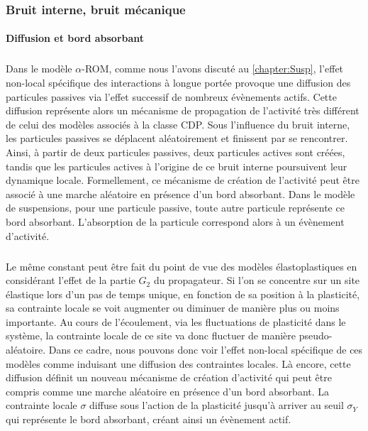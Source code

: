 \endgroup

\subsubsection{Bruit interne, bruit mécanique}

\paragraph{Diffusion et bord absorbant}

\subparagraph{}Dans le modèle $\alpha$-ROM, comme nous l'avons discuté au \autoref{chapter:Susp}, l'effet non-local spécifique des interactions à longue portée provoque une diffusion des particules passives via l'effet successif de nombreux évènements actifs. Cette diffusion représente alors un mécanisme de propagation de l'activité très différent de celui des modèles associés à la classe CDP. Sous l’influence du bruit interne, les particules passives se déplacent aléatoirement et finissent par se rencontrer. Ainsi, à partir de deux particules passives, deux particules actives sont créées, tandis que les particules actives à l'origine de ce bruit interne poursuivent leur dynamique locale. Formellement, ce mécanisme de création de l'activité peut être associé à une marche aléatoire en présence d'un bord absorbant. Dans le modèle de suspensions, pour une particule passive, toute autre particule représente ce bord absorbant. L'absorption de la particule correspond alors à un évènement d'activité.

\subparagraph{}Le même constant peut être fait du point de vue des modèles élastoplastiques en considérant l'effet de la partie $G_2$ du propagateur. Si l'on se concentre sur un site élastique lors d'un pas de temps unique, en fonction de sa position à la plasticité, sa contrainte locale se voit augmenter ou diminuer de manière plus ou moins importante. Au cours de l'écoulement, via les fluctuations de plasticité dans le système, la contrainte locale de ce site va donc fluctuer de manière pseudo-aléatoire. Dans ce cadre, nous pouvons donc voir l'effet non-local spécifique de ces modèles comme induisant une diffusion des contraintes locales. Là encore, cette diffusion définit un nouveau mécanisme de création d'activité qui peut être compris comme une marche aléatoire en présence d'un bord absorbant. La contrainte locale $\sigma$ diffuse sous l'action de la plasticité jusqu'à arriver au seuil $\sigma_Y$ qui représente le bord absorbant, créant ainsi un évènement actif. 

